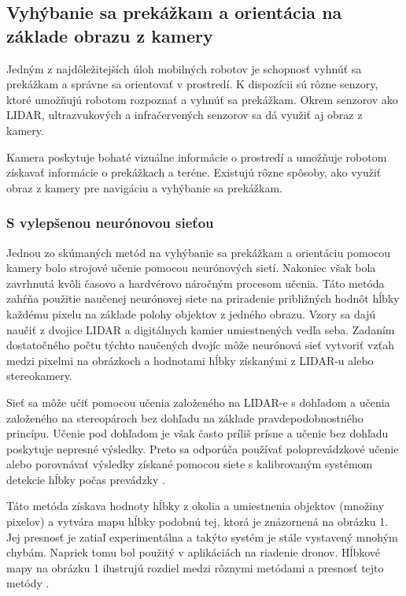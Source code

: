 \subsection{Vyhýbanie sa prekážkam a orientácia na základe obrazu z kamery}
Jedným z najdôležitejších úloh mobilných robotov je schopnosť vyhnúť sa prekážkam a správne sa orientovať v prostredí. K dispozícii sú rôzne senzory, ktoré umožňujú robotom rozpoznať a vyhnúť sa prekážkam. Okrem senzorov ako LIDAR, ultrazvukových a infračervených senzorov sa dá využiť aj obraz z kamery.

Kamera poskytuje bohaté vizuálne informácie o prostredí a umožňuje robotom získavať informácie o prekážkach a teréne. Existujú rôzne spôsoby, ako využiť obraz z kamery pre navigáciu a vyhýbanie sa prekážkam.

\subsubsection{S vylepšenou neurónovou sieťou}
Jednou zo skúmaných metód na vyhýbanie sa prekážkam a orientáciu pomocou kamery bolo strojové učenie pomocou neurónových sietí. Nakoniec však bola zavrhnutá kvôli časovo a hardvérovo náročným procesom učenia. Táto metóda zahŕňa použitie naučenej neurónovej siete na priradenie približných hodnôt hĺbky každému pixelu na základe polohy objektov z jedného obrazu. Vzory sa dajú naučiť z dvojice LIDAR a digitálnych kamier umiestnených vedľa seba. Zadaním dostatočného počtu týchto naučených dvojíc môže neurónová sieť vytvoriť vzťah medzi pixelmi na obrázkoch a hodnotami hĺbky získanými z LIDAR-u alebo stereokamery.

Sieť sa môže učiť pomocou učenia založeného na LIDAR-e s dohľadom a učenia založeného na stereopároch bez dohľadu na základe pravdepodobnostného princípu. Učenie pod dohľadom je však často príliš prísne a učenie bez dohľadu poskytuje nepresné výsledky. Preto sa odporúča používať poloprevádzkové učenie alebo porovnávať výsledky získané pomocou siete s kalibrovaným systémom detekcie hĺbky počas prevádzky \citep{xie2016edge}.

Táto metóda získava hodnoty hĺbky z okolia a umiestnenia objektov (množiny pixelov) a vytvára mapu hĺbky podobnú tej, ktorá je znázornená na obrázku 1. Jej presnosť je zatiaľ experimentálna a takýto systém je stále vystavený mnohým chybám. Napriek tomu bol použitý v aplikáciách na riadenie dronov. Hĺbkové mapy na obrázku 1 ilustrujú rozdiel medzi rôznymi metódami a presnosť tejto metódy \citep{ikeoka2018depth, xie2016edge}.

